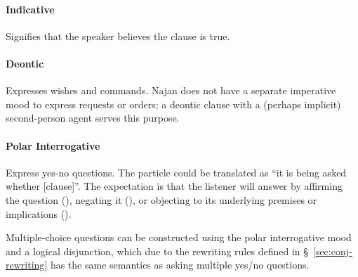 \paragraph{Indicative} Signifies that the speaker believes the clause is true.

\paragraph{Deontic} Expresses wishes and commands. Najan does not have a
separate imperative mood to express requests or orders; a deontic clause with a
(perhaps implicit) second-person agent serves this purpose.

\paragraph{Polar Interrogative} Express yes-no questions. The particle
 could be translated as ``it is being asked whether [clause]''. The
expectation is that the listener will answer by affirming the question
(), negating it (), or objecting to its underlying
premises or implications ().



Multiple-choice questions can be constructed using the polar interrogative mood
and a logical disjunction, which due to the rewriting rules defined in
\S~\ref{sec:conj-rewriting} has the same semantics as asking multiple yes/no
questions.

